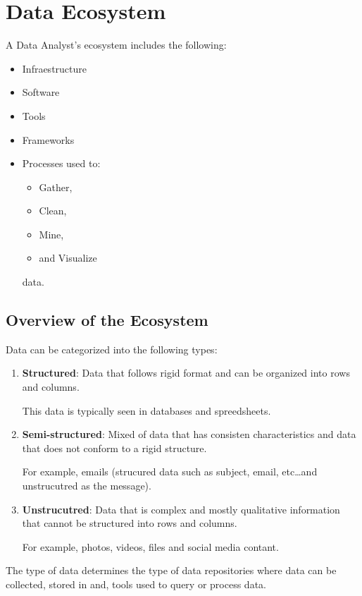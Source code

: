 \documentclass[../../ibm_data_analysis.tex]{subfiles}
\begin{document}
    \chapter{Data Ecosystem}

    A Data Analyst's ecosystem includes the following:
    \begin{itemize}
        \item Infraestructure
        \item Software
        \item Tools
        \item Frameworks
        \item Processes used to:
        \begin{itemize}
            \item Gather,
            \item Clean,
            \item Mine,
            \item and Visualize
        \end{itemize}
        data.
    \end{itemize}

    \section{Overview of the Ecosystem}

    Data can be categorized into the following types:
    \begin{enumerate}
        \item \textbf{Structured}: Data that follows rigid format and can be organized into rows and columns.
        
        This data is typically seen in databases and spreedsheets.
        \item \textbf{Semi-structured}: Mixed of data that has consisten characteristics and data that does not conform to a rigid structure.
        
        For example, emails (strucured data such as subject, email, etc\dots and unstrucutred as the message).
        
        \item \textbf{Unstrucutred}: Data that is complex and mostly qualitative information that cannot be structured into rows and columns.
        
        For example, photos, videos, files and social media contant.
    \end{enumerate}

    \begin{obs}
        The type of data determines the type of data repositories where data can be collected, stored in and, tools used to query or process data.
    \end{obs}
\end{document}

